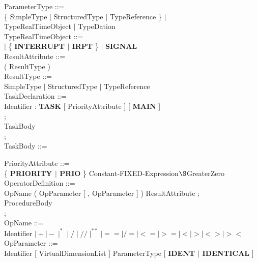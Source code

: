 ParameterType ::=\\
\x [ {\bf INV} ] \{ SimpleType $\mid$ StructuredType $\mid$ TypeReference \} $\mid$\\   
\x \x TypeRealTimeObject $\mid$ TypeDation\\

TypeRealTimeObject ::=\\   
 $\mid$ \{ {\bf INTERRUPT $\mid$ IRPT} \} $\mid$ {\bf SIGNAL}\\   

ResultAttribute ::=\\
 ( ResultType )\\

ResultType ::=\\
\x SimpleType $\mid$ StructuredType $\mid$ TypeReference\\

TaskDeclaration ::=\\
\x Identifier : {\bf TASK} [ PriorityAttribute ] [ {\bf MAIN} ]\\
\x [ GlobalAttribute ]  ;\\

\x \x TaskBody\\

 ;\\

TaskBody ::=\\
        
PriorityAttribute ::=\\
\x \{ {\bf PRIORITY $\mid$ PRIO} \} Constant-FIXED-Expression$\S $GreaterZero\\

OperatorDefinition ::= \\
 OpName ( OpParameter [ , OpParameter ] ) ResultAttribute ;\\

\x \x ProcedureBody\\

 ; \\

OpName ::=\\
\x Identifier $\mid + \mid - \mid ^* \mid / \mid // \mid ^{**} \mid == \mid /= \mid <= \mid >= \mid < \mid > \mid <> \mid ><$\\

OpParameter ::=\\
\x Identifier [ VirtualDimensionList ] ParameterType [ {\bf IDENT $\mid$ IDENTICAL} ] \\

